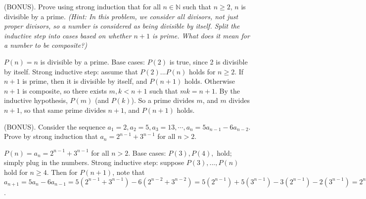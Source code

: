 \documentclass[solution, letterpaper]{cs20inclass}
\begin{document}
\problem 

(BONUS). Prove using strong induction that for all $n \in \mathbb{N}$ such that $n \ge 2$, $n$ is divisible by a prime. {\em (Hint: In this problem, we consider all divisors, not just proper divisors, so a number is considered as being divisible by itself.  Split the inductive step into cases based on whether $n+1$ is prime.  What does it mean for a number to be composite?)}

\begin{solution}

$P(n) = n$ is divisible by a prime. Base cases: $P(2)$ is true, since 2 is divisible by itself. Strong inductive step: assume that $P(2)...P(n)$ holds for $n \ge 2$. If $n+1$ is prime, then it is divisible by itself, and $P(n+1)$ holds. Otherwise $n+1$ is composite, so there exists  $m, k < n+1$ such that $mk = n+1$. By the inductive hypothesis, $P(m)$ (and $P(k)$). So a prime divides $m$, and $m$ divides $n+1$, so that same prime divides $n+1$, and $P(n+1)$ holds.

\end{solution}

\problem (BONUS). Consider the sequence $a_1= 2, a_2= 5, a_3= 13, \cdots , a_{n} = 5a_{n-1} - 6 a_{n-2}$.
Prove by strong induction that $a_n = 2^{n-1} + 3^{n-1}$ for all $n > 2$.

\begin{solution}

$P(n) = a_n = 2^{n-1} + 3^{n-1}$ for all $n > 2$. Base cases: $P(3), P(4), $ hold; simply plug in the numbers. Strong inductive step: suppose $P(3), ..., P(n)$ hold for $n \ge 4$. Then for $P(n+1)$, note that $a_{n+1} = 5a_{n} - 6 a_{n-1} = 5(2^{n-1} + 3^{n-1}) - 6(2^{n-2} + 3^{n-2}) = 5(2^{n-1}) + 5(3^{n-1}) - 3(2^{n-1}) - 2(3^{n-1}) = 2^n + 3^n$.
 
\end{solution}
\end{document}
